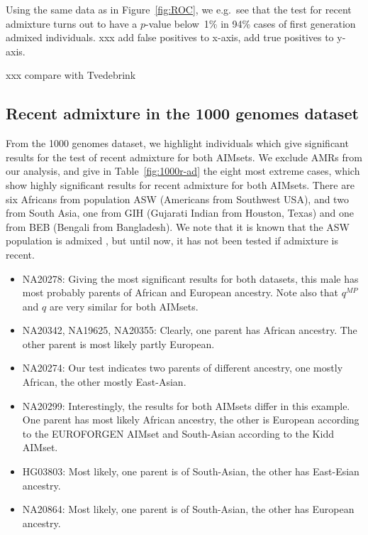 \documentclass[12pt]{article}
\theoremstyle{definition}
\begin{document}
\begin{table}
  \centering
  
  \caption{Using the same data as in Figure~\ref{fig:ROC}, we e.g.\
    see that the test for recent admixture turns out to have a
    $p$-value below~1\% in 94\% cases of first generation admixed
    individuals. xxx add false positives to x-axis, add true positives
    to y-axis.}
  \label{tab:power}
\end{table}

xxx compare with Tvedebrink

\subsection{Recent admixture in the 1000 genomes dataset}
From the 1000 genomes dataset, we highlight individuals which give
significant results for the test of recent admixture for both
AIMsets. We exclude AMRs from our analysis, and give in
Table~\ref{fig:1000r-ad} the eight most extreme cases, which show
highly significant results for recent admixture for both
AIMsets. There are six Africans from population ASW (Americans from
Southwest USA), and two from South Asia, one from GIH (Gujarati Indian
from Houston, Texas) and one from BEB (Bengali from Bangladesh). We
note that it is known that the ASW population is admixed
\cite{Eduardoff2016}, but until now, it has not been tested if
admixture is recent.

\begin{itemize}
\item NA20278: Giving the most significant results for both datasets,
  this male has most probably parents of African and European
  ancestry. Note also that $q^{MP}$ and $q$ are very similar for both
  AIMsets.
\item NA20342, NA19625, NA20355: Clearly, one parent has African
  ancestry. The other parent is most likely partly European.
\item NA20274: Our test indicates two parents of different ancestry,
  one mostly African, the other mostly East-Asian.
\item NA20299: Interestingly, the results for both AIMsets differ in
  this example. One parent has most likely African ancestry, the other
  is European according to the EUROFORGEN AIMset and South-Asian
  according to the Kidd AIMset.
\item HG03803: Most likely, one parent is of South-Asian, the other
  has East-Esian ancestry.
\item NA20864: Most likely, one parent is of South-Asian, the other
  has European ancestry.
\end{itemize}
\end{document}
